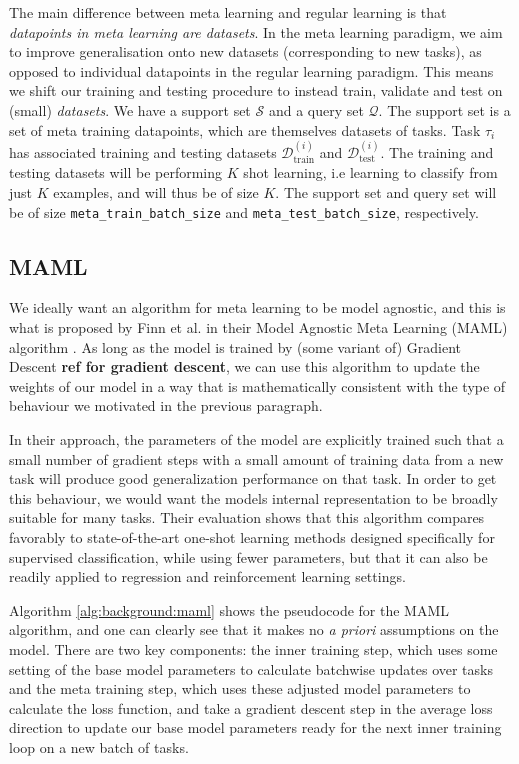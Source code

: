 {{The main difference between meta learning and regular learning is that \textit{datapoints in meta learning are datasets}. In the meta learning paradigm, we aim to improve generalisation onto new datasets (corresponding to new tasks), as opposed to individual datapoints in the regular learning paradigm. This means we shift our training and testing procedure to instead train, validate and test on (small) \textit{datasets}.  We have a support set $\mathcal{S}$ and a query set $\mathcal{Q}$. The support set is a set of meta training datapoints, which are themselves datasets of tasks. Task $\tau_i$ has associated training and testing datasets $\mathcal{D}_\text{train}^{(i)}$ and $\mathcal{D}_\text{test}^{(i)}$. The training and testing datasets will be performing $K$ shot learning, i.e learning to classify from just $K$ examples, and will thus be of size $K$. The support set and query set will be of size \texttt{meta\_train\_batch\_size} and \texttt{meta\_test\_batch\_size}, respectively.

\subsection{MAML}
We ideally want an algorithm for meta learning to be model agnostic, and this is what is proposed by Finn et al. in their Model Agnostic Meta Learning (MAML) algorithm \cite{Finn2017}. As long as the model is trained by (some variant of) Gradient Descent \textbf{ref for gradient descent}, we can use this algorithm to update the weights of our model in a way that is mathematically consistent with the type of behaviour we motivated in the previous paragraph.

In their approach, the parameters of the model are explicitly trained such that a small number of gradient steps with a small amount of training data from a new task will produce good generalization performance on that task. In order to get this behaviour, we would want the models internal representation to be broadly suitable for many tasks. Their evaluation shows that this algorithm compares favorably to state-of-the-art one-shot learning methods designed specifically for supervised classification, while using fewer parameters, but that it can also be readily applied to regression and reinforcement learning settings.

Algorithm \ref{alg:background:maml} shows the pseudocode for the MAML algorithm, and one can clearly see that it makes no \textit{a priori} assumptions on the model. There are two key components: the inner training step, which uses some setting of the base model parameters to calculate batchwise updates over tasks and the meta training step, which uses these adjusted model parameters to calculate the loss function, and take a gradient descent step in the average loss direction to update our base model parameters ready for the next inner training loop on a new batch of tasks.

}}
